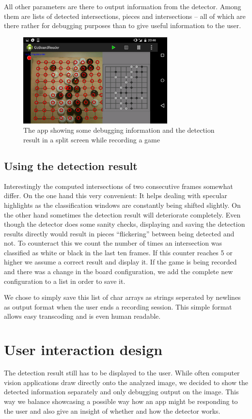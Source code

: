 	All other parameters are there to output information from the detector. Among them are lists of detected intersections, pieces and intersections -- all of which are there rather for debugging purposes than to give useful information to the user.

	\begin{figure}[t!]
		\center
		\includegraphics[width=0.7\textwidth]{images/android_ui.png}
		\caption{The app showing some debugging information and the detection result in a split screen while recording a game}
		\label{fig:android_ui}
	\end{figure}

	\subsection{Using the detection result}
	\label{android-detector-usingResults}
	Interestingly the computed intersections of two consecutive frames somewhat differ. On the one hand this very convenient: It helps dealing with specular highlights as the classification windows are constantly being shifted slightly. On the other hand sometimes the detection result will deteriorate completely. Even though the detector does some sanity checks, displaying and saving the detection results directly would result in pieces ``flickering'' between being detected and not. To counteract this we count the number of times an intersection was classified as white or black in the last ten frames. If this counter reaches 5 or higher we assume a correct result and display it. If the game is being recorded and there was a change in the board configuration, we add the complete new configuration to a list in order to save it.

	We chose to simply save this list of char arrays as strings seperated by newlines as output format when the user ends a recording session. This simple format allows easy transcoding and is even human readable.

	\section{User interaction design}
	\label{android-ui}
	The detection result still has to be displayed to the user. While often computer vision applications draw directly onto the analyzed image, we decided to show the detected information separately and only debugging output on the image. This way we balance showcasing a possible way how an app might be responding to the user and also give an insight of whether and how the detector works.

